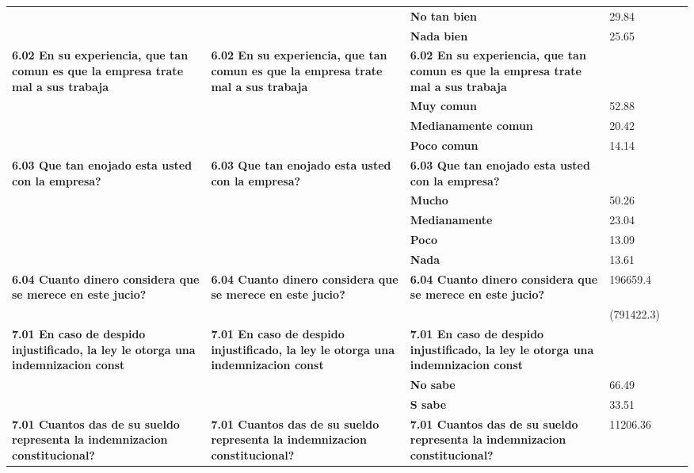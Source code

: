 \begin{longtable}{p{3cm}p{3cm}p{3cm}p{1.5cm}p{1.5cm}p{1.5cm}}
\textbf{ } & \textbf{ } & \textbf{No tan bien} & 29.84 &       &  \\
\textbf{ } & \textbf{ } & \textbf{Nada bien} & 25.65 &       &  \\
\textbf{6.02 En su experiencia, que tan comun es que la empresa trate mal a sus trabaja} & \textbf{6.02 En su experiencia, que tan comun es que la empresa trate mal a sus trabaja} & \textbf{6.02 En su experiencia, que tan comun es que la empresa trate mal a sus trabaja} &       &       &  \\
\textbf{ } & \textbf{ } & \textbf{Muy comun} & 52.88 &       &  \\
\textbf{ } & \textbf{ } & \textbf{Medianamente comun} & 20.42 &       &  \\
\textbf{ } & \textbf{ } & \textbf{Poco comun} & 14.14 &       &  \\
\textbf{6.03 Que tan enojado esta usted con la empresa?} & \textbf{6.03 Que tan enojado esta usted con la empresa?} & \textbf{6.03 Que tan enojado esta usted con la empresa?} &       &       &  \\
\textbf{ } & \textbf{ } & \textbf{Mucho          } & 50.26 &       &  \\
\textbf{ } & \textbf{ } & \textbf{Medianamente} & 23.04 &       &  \\
\textbf{ } & \textbf{ } & \textbf{Poco} & 13.09 &       &  \\
\textbf{ } & \textbf{ } & \textbf{Nada} & 13.61 &       &  \\
\textbf{6.04 Cuanto dinero considera que se merece en este jucio?} & \textbf{6.04 Cuanto dinero considera que se merece en este jucio?} & \textbf{6.04 Cuanto dinero considera que se merece en este jucio?} & 196659.4 &       &  \\
\textbf{ } & \textbf{ } & \textbf{ } & (791422.3) &       &  \\
\textbf{7.01 En caso de despido injustificado,  la ley le otorga una indemnizacion const} & \textbf{7.01 En caso de despido injustificado,  la ley le otorga una indemnizacion const} & \textbf{7.01 En caso de despido injustificado,  la ley le otorga una indemnizacion const} &       &       &  \\
\textbf{ } & \textbf{ } & \textbf{No sabe } & 66.49 &       &  \\
\textbf{ } & \textbf{ } & \textbf{S sabe } & 33.51 &       &  \\
\textbf{7.01 Cuantos das de su sueldo representa la indemnizacion constitucional?} & \textbf{7.01 Cuantos das de su sueldo representa la indemnizacion constitucional?} & \textbf{7.01 Cuantos das de su sueldo representa la indemnizacion constitucional?} & 11206.36 &       &  \\

\end{longtable}
